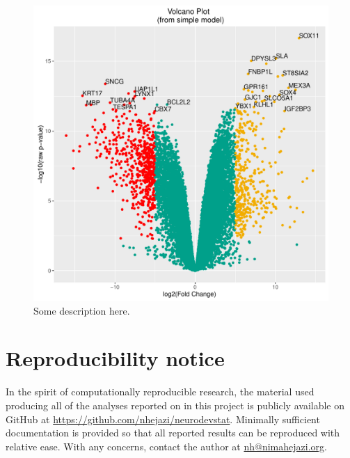 \documentclass[11pt]{article}
\begin{document}
\begin{figure}[H]
\centering
\includegraphics[scale=0.8]{volcano_simplemod_genes.pdf}
\caption{Some description here.}
\end{figure}


\section{Reproducibility notice}
In the spirit of computationally reproducible research, the material used
producing all of the analyses reported on in this project is publicly available
on GitHub at \url{https://github.com/nhejazi/neurodevstat}. Minimally sufficient
documentation is provided so that all reported results can be reproduced with
relative ease. With any concerns, contact the author at
\href{mailto:nh@nimahejazi.org}{nh@nimahejazi.org}.
\end{document}
